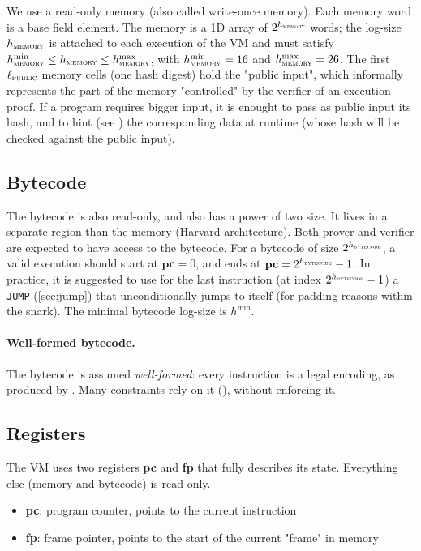\documentclass{article}
\theoremstyle{definition}
\begin{document}
We use a read-only memory (also called write-once memory). Each memory word is a base field element. The memory is a 1D array of $2^{h_\textsc{memory}}$ words; the log-size $h_\textsc{memory}$ is attached to each execution of the VM and must satisfy $h_\textsc{memory}^{\min} \leq h_\textsc{memory} \leq h_\textsc{memory}^{\max}$, with $h_\textsc{memory}^{\min} = 16$ and $h_\textsc{memory}^{\max} = 26$. The first $\ell_\textsc{public}$ memory cells (one hash digest) hold the "public input", which informally represents the part of the memory "controlled" by the verifier of an execution proof. If a program requires bigger input, it is enought to pass as public input its hash, and to hint (see ) the corresponding data at runtime (whose hash will be checked against the public input).

\subsection{Bytecode}\label{sec:bytecode}

The bytecode is also read-only, and also has a power of two size. It lives in a separate region than the memory (Harvard architecture). Both prover and verifier are expected to have access to the bytecode. For a bytecode of size $2^{h_\textsc{bytecode}}$, a valid execution should start at $\textbf{pc} = 0$, and ends at $\textbf{pc} = 2^{h_\textsc{bytecode}} - 1$. In practice, it is suggested to use for the last instruction (at index $2^{h_\textsc{bytecode}} - 1$) a \texttt{JUMP} (\cref{sec:jump}) that unconditionally jumps to itself (for padding reasons within the snark). The minimal bytecode log-size is $h^{\min}$.

\paragraph{Well-formed bytecode.} The bytecode is assumed \emph{well-formed}: every instruction is a legal encoding, as produced by . Many constraints rely on it (), without enforcing it.

\subsection{Registers}

The VM uses two registers \textbf{pc} and \textbf{fp} that fully describes its state. Everything else (memory and bytecode) is read-only.

\begin{itemize}
    \item \textbf{pc}: program counter, points to the current instruction
    \item \textbf{fp}: frame pointer, points to the start of the current "frame" in memory
\end{itemize}
\end{document}
